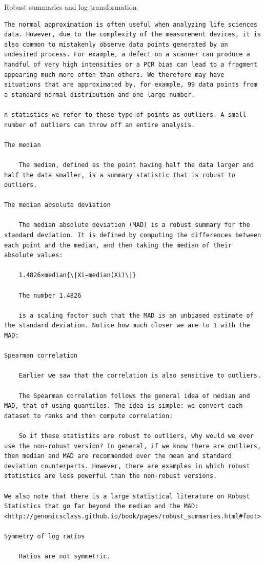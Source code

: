 \documentclass[
]{book}
\begin{document}
Robust summaries and log transformation

\begin{verbatim}
The normal approximation is often useful when analyzing life sciences data. However, due to the complexity of the measurement devices, it is also common to mistakenly observe data points generated by an undesired process. For example, a defect on a scanner can produce a handful of very high intensities or a PCR bias can lead to a fragment appearing much more often than others. We therefore may have situations that are approximated by, for example, 99 data points from a standard normal distribution and one large number.    

n statistics we refer to these type of points as outliers. A small number of outliers can throw off an entire analysis.

The median

    The median, defined as the point having half the data larger and half the data smaller, is a summary statistic that is robust to outliers.

The median absolute deviation

    The median absolute deviation (MAD) is a robust summary for the standard deviation. It is defined by computing the differences between each point and the median, and then taking the median of their absolute values:

    1.4826×median{\|Xi−median(Xi)\|}

    The number 1.4826

    is a scaling factor such that the MAD is an unbiased estimate of the standard deviation. Notice how much closer we are to 1 with the MAD:

Spearman correlation

    Earlier we saw that the correlation is also sensitive to outliers.

    The Spearman correlation follows the general idea of median and MAD, that of using quantiles. The idea is simple: we convert each dataset to ranks and then compute correlation:

    So if these statistics are robust to outliers, why would we ever use the non-robust version? In general, if we know there are outliers, then median and MAD are recommended over the mean and standard deviation counterparts. However, there are examples in which robust statistics are less powerful than the non-robust versions.

We also note that there is a large statistical literature on Robust Statistics that go far beyond the median and the MAD: <http://genomicsclass.github.io/book/pages/robust_summaries.html#foot>

Symmetry of log ratios

    Ratios are not symmetric.
\end{verbatim}
\end{document}

